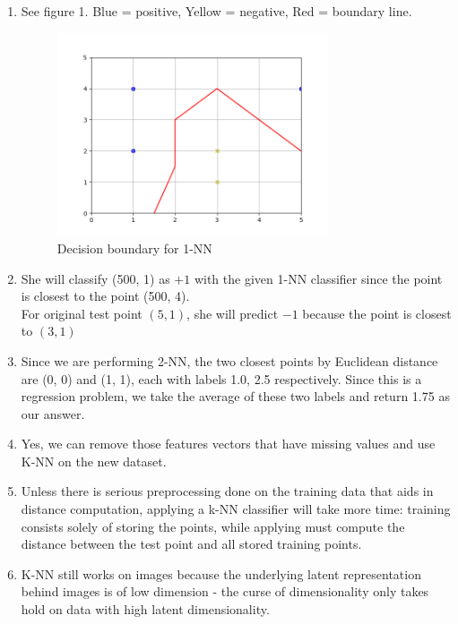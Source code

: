 \documentclass[11pt]{article}
\begin{document}
	\begin{enumerate}
		\item See figure 1. Blue = positive, Yellow = negative, Red = boundary line.
		\begin{figure}[h!]
			\includegraphics[width=8cm]{Graph1_solution.png}
			\centering
			\caption{Decision boundary for 1-NN }
		\end{figure}
		
		\item She will classify (500, 1) as $+1$ with the given 1-NN classifier since the point is closest to the point (500, 4).\\ For original test point $(5, 1)$, she will predict $-1$ because the point is closest to $(3, 1)$
		\item Since we are performing 2-NN, the two closest points by Euclidean distance are (0, 0) and (1, 1), each with labels 1.0, 2.5 respectively. Since this is a regression problem, we take the average of these two labels and return 1.75 as our answer.
		\item Yes, we can remove those features vectors that have missing values and use K-NN on the new dataset.
		\item Unless there is serious preprocessing done on the training data that aids in distance computation,
		applying a k-NN classifier will take more time: training consists solely of storing the points, while
		applying must compute the distance between the test point and all stored training points.
		
		\item K-NN still works on images because the underlying latent representation behind images is of low dimension - the curse of dimensionality only takes hold on data with high latent dimensionality.
		
	\end{enumerate}
\end{document}
